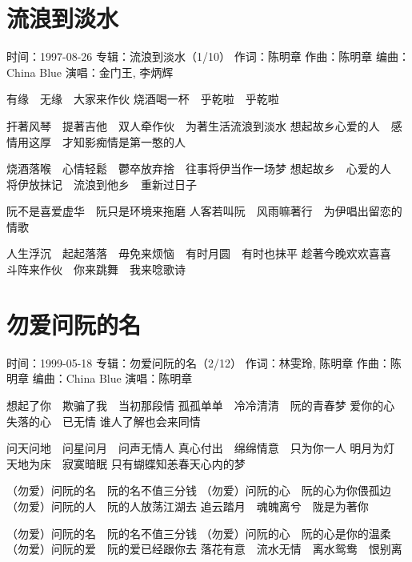 \documentclass[UTF8,a4paper,oneside,twocolumn,12pt]{ctexbook}
\newcommand{\infopair}[2]{\textbullet #1：#2}
\newcommand{\zc}[1][伍佰]{\infopair{作词}{#1}}
\newcommand{\zq}[1][伍佰]{\infopair{作曲}{#1}}
\newcommand{\bq}[1][伍佰]{\infopair{编曲}{#1}}
\newcommand{\zj}[1]{\infopair{专辑}{#1}}
\newcommand{\sj}[1]{\infopair{时间}{#1}}
\newenvironment{info}{\begin{flushleft}\kaishu
	}
	{\end{flushleft}\normalsize\yahei\par}
\newenvironment{lyric}{
	}
{}
\begin{document}
\section{流浪到淡水}
\begin{info}
	\sj{1997-08-26}%
	\zj{流浪到淡水（1/10）}
	\zc[陈明章]
	\zq[陈明章]
	\bq[China Blue]
	\infopair{演唱}{金门王, 李炳辉}
\end{info}
\begin{lyric}
	有缘　无缘　大家来作伙
	烧酒喝一杯　乎乾啦　乎乾啦

	扞著风琴　提著吉他　双人牵作伙　为著生活流浪到淡水
	想起故乡心爱的人　感情用这厚　才知影痴情是第一憨的人

	烧酒落喉　心情轻鬆　鬱卒放弃捨　往事将伊当作一场梦
	想起故乡　心爱的人　将伊放抹记　流浪到他乡　重新过日子

	阮不是喜爱虚华　阮只是环境来拖磨
	人客若叫阮　风雨嘛著行　为伊唱出留恋的情歌

	人生浮沉　起起落落　毋免来烦恼　有时月圆　有时也抹平
	趁著今晚欢欢喜喜　斗阵来作伙　你来跳舞　我来唸歌诗
\end{lyric}

\section{勿爱问阮的名}
\begin{info}
	\sj{1999-05-18}
	\zj{勿爱问阮的名（2/12）}
	\zc[林雯玲, 陈明章]
	\zq[陈明章]
	\bq[China Blue]
	\infopair{演唱}{陈明章}
\end{info}
\begin{lyric}
	想起了你　欺骗了我　当初那段情
	孤孤单单　冷冷清清　阮的青春梦
	爱你的心　失落的心　已无情
	谁人了解也会来同情

	问天问地　问星问月　问声无情人
	真心付出　绵绵情意　只为你一人
	明月为灯　天地为床　寂寞暗眠
	只有蝴蝶知恙春天心内的梦

	（勿爱）问阮的名　阮的名不值三分钱
	（勿爱）问阮的心　阮的心为你偎孤边
	（勿爱）问阮的人　阮的人放荡江湖去
	追云踏月　魂魄离兮　陇是为著你

	（勿爱）问阮的名　阮的名不值三分钱
	（勿爱）问阮的心　阮的心是你的温柔
	（勿爱）问阮的爱　阮的爱已经跟你去
	落花有意　流水无情　离水鸳鸯　恨别离
\end{lyric}
\end{document}
